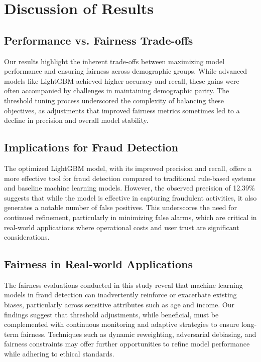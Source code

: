 \documentclass[12pt,a4paper]{report}
\begin{document}
\section{Discussion of Results}

\subsection{Performance vs. Fairness Trade-offs}

Our results highlight the inherent trade-offs between maximizing model performance and ensuring fairness across demographic groups. While advanced models like LightGBM achieved higher accuracy and recall, these gains were often accompanied by challenges in maintaining demographic parity. The threshold tuning process underscored the complexity of balancing these objectives, as adjustments that improved fairness metrics sometimes led to a decline in precision and overall model stability.

\subsection{Implications for Fraud Detection}

The optimized LightGBM model, with its improved precision and recall, offers a more effective tool for fraud detection compared to traditional rule-based systems and baseline machine learning models. However, the observed precision of 12.39\% suggests that while the model is effective in capturing fraudulent activities, it also generates a notable number of false positives. This underscores the need for continued refinement, particularly in minimizing false alarms, which are critical in real-world applications where operational costs and user trust are significant considerations.

\subsection{Fairness in Real-world Applications}

The fairness evaluations conducted in this study reveal that machine learning models in fraud detection can inadvertently reinforce or exacerbate existing biases, particularly across sensitive attributes such as age and income. Our findings suggest that threshold adjustments, while beneficial, must be complemented with continuous monitoring and adaptive strategies to ensure long-term fairness. Techniques such as dynamic reweighting, adversarial debiasing, and fairness constraints may offer further opportunities to refine model performance while adhering to ethical standards.
\end{document}
